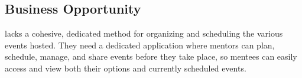 \subsection{Business Opportunity}
{\ClientName} lacks a cohesive, dedicated method for organizing and scheduling
the various events hosted. They need a dedicated application where mentors can
plan, schedule, manage, and share events before they take place, so mentees can
easily access and view both their options and currently scheduled events.
